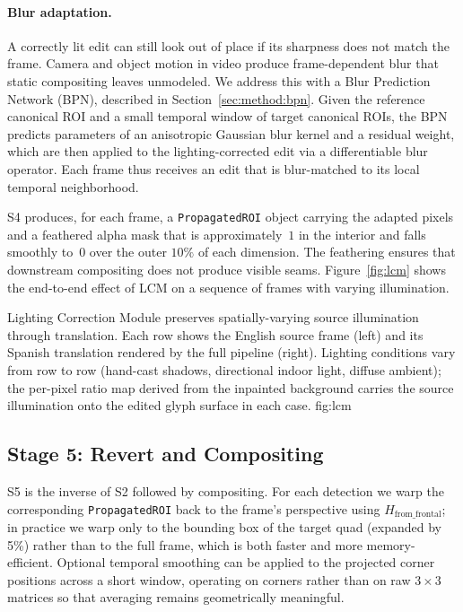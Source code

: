 \paragraph{Blur adaptation.}
A correctly lit edit can still look out of place if its sharpness
does not match the frame. Camera and object motion in video
produce frame-dependent blur that static compositing leaves
unmodeled. We address this with a Blur Prediction Network (BPN),
described in Section~\ref{sec:method:bpn}. Given the reference
canonical ROI and a small temporal window of target canonical
ROIs, the BPN predicts parameters of an anisotropic Gaussian blur
kernel and a residual weight, which are then applied to the
lighting-corrected edit via a differentiable blur operator. Each
frame thus receives an edit that is blur-matched to its local
temporal neighborhood.

S4 produces, for each frame, a \texttt{PropagatedROI} object
carrying the adapted pixels and a feathered alpha mask that is
approximately~$1$ in the interior and falls smoothly to~$0$ over
the outer $10\%$ of each dimension. The feathering ensures that
downstream compositing does not produce visible seams.
Figure~\ref{fig:lcm} shows the end-to-end effect of LCM on a
sequence of frames with varying illumination.

%
  {Lighting Correction Module preserves spatially-varying source
   illumination through translation. Each row shows the English
   source frame (left) and its Spanish translation rendered by the
   full pipeline (right). Lighting conditions vary from row to row
   (hand-cast shadows, directional indoor light, diffuse ambient);
   the per-pixel ratio map derived from the inpainted background
   carries the source illumination onto the edited glyph surface
   in each case.}%
  {fig:lcm}

\subsection{Stage 5: Revert and Compositing}
\label{sec:method:s5}

S5 is the inverse of S2 followed by compositing. For each
detection we warp the corresponding \texttt{PropagatedROI} back to
the frame's perspective using $H_{\mathrm{from\_frontal}}$; in
practice we warp only to the bounding box of the target quad
(expanded by 5\%) rather than to the full frame, which is both
faster and more memory-efficient. Optional temporal smoothing can
be applied to the projected corner positions across a short
window, operating on corners rather than on raw $3\times 3$
matrices so that averaging remains geometrically meaningful.


